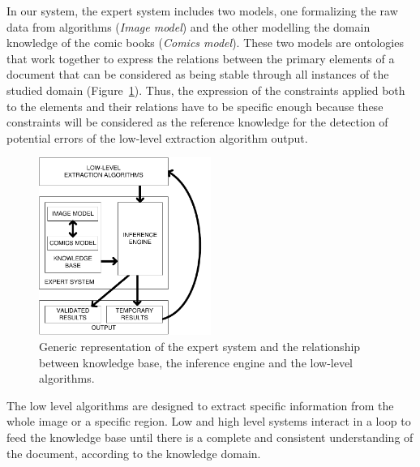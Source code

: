 In our system, the expert system includes two models, one formalizing the raw data from algorithms (\emph{Image model}) and the other modelling the domain knowledge of the comic books (\emph{Comics model}).
These two models are ontologies that work together to
express the relations between the primary elements of a document that can be considered as being stable through all instances of the studied domain (Figure~\ref{fig:kn:generic_expert_system}).
Thus, the expression of the constraints applied both to the elements and their relations have to be specific enough because these constraints will be considered as the reference knowledge for the detection of potential errors of the low-level extraction algorithm output.

 \begin{figure}[!ht]  %
   \centering
  \includegraphics[trim= 0px 0px 0px 0px, clip, width=0.5\textwidth]{expert_system.pdf}
  \caption[Generic representation of the expert system and the relationship between knowledge base, the inference engine and the low-level algorithms]{Generic representation of the expert system and the relationship between knowledge base, the inference engine and the low-level algorithms.}
  \label{fig:kn:generic_expert_system}
 \end{figure}


The low level algorithms are designed to extract specific information from the whole image or a specific region.
Low and high level systems interact in a loop to feed the knowledge base until there is a complete and consistent understanding of the document, according to the knowledge domain. 



